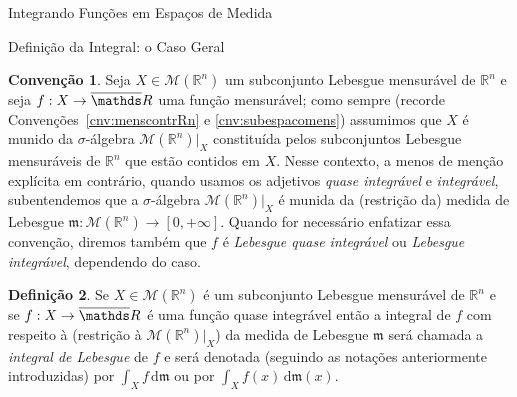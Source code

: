 \documentclass[oneside,final,11pt]{amsbook}
\newcommand{\R}{\mathds R}
\newcommand{\leb}{\mathfrak m}
\newcommand{\dd}{\mathrm d}
\newcommand{\Lebmens}{\mathcal M}
\theoremstyle{remark}\newtheorem{exercise}{Exercício}[chapter]
\theoremstyle{remark}\newtheorem{*exercise}[exercise]{\hbox to 0pt{\hskip 0pt minus 1fil*}Exercício}
\theoremstyle{definition}\newtheorem{exdefin}{Definição}[chapter]
\theoremstyle{plain}\newtheorem{teo}{Teorema}[section]
\theoremstyle{plain}\newtheorem{lem}[teo]{Lema}
\theoremstyle{plain}\newtheorem{prop}[teo]{Proposição}
\theoremstyle{plain}\newtheorem{cor}[teo]{Corolário}
\theoremstyle{definition}\newtheorem{defin}[teo]{Definição}
\theoremstyle{remark}\newtheorem{rem}[teo]{Observação}
\theoremstyle{definition}\newtheorem{notation}[teo]{Notação}
\theoremstyle{definition}\newtheorem{convention}[teo]{Convenção}
\theoremstyle{definition}\newtheorem{example}[teo]{Exemplo}
\numberwithin{section}{chapter}
\numberwithin{equation}{section}
\begin{document}
\begin{chapter}{Integrando Funções em Espaços de Medida}
\begin{section}{Definição da Integral: o Caso Geral}
\begin{convention}
Seja $X\in\Lebmens(\R^n)$ um subconjunto Lebesgue mensurável de $\R^n$ e seja
$f:X\to\overline\R$ uma função mensurável; como sempre (recorde Convenções~\ref{cnv:menscontrRn} e
\ref{cnv:subespacomens}) assumimos que $X$ é munido da $\sigma$-álgebra $\Lebmens(\R^n)\vert_X$
constituída pelos subconjuntos Lebesgue mensuráveis de $\R^n$ que estão contidos em $X$.
Nesse contexto, a menos de menção explícita em contrário, quando usamos os adjetivos {\em quase integrável\/}
e {\em integrável\/}, subentendemos que a $\sigma$-álgebra $\Lebmens(\R^n)\vert_X$
é munida da (restrição da) medida de Lebesgue $\leb:\Lebmens(\R^n)\to[0,+\infty]$.
Quando for necessário enfatizar essa convenção, diremos também que $f$ é {\em Lebesgue
quase integrável\/} ou
{\em Lebesgue integrável},
dependendo do caso.
\end{convention}

\begin{defin}
Se $X\in\Lebmens(\R^n)$ é um subconjunto Lebesgue mensurável de $\R^n$ e se
$f:X\to\overline\R$ é uma função quase integrável então a integral de $f$ com respeito
à (restrição à $\Lebmens(\R^n)\vert_X$) da medida de Lebesgue $\leb$ será chamada a
{\em integral de Lebesgue\/}
de $f$ e será denotada (seguindo as notações anteriormente introduzidas) por $\int_Xf\,\dd\leb$ ou
por $\int_Xf(x)\,\dd\leb(x)$.
\end{defin}


\end{section}
\end{chapter}
\end{document}
